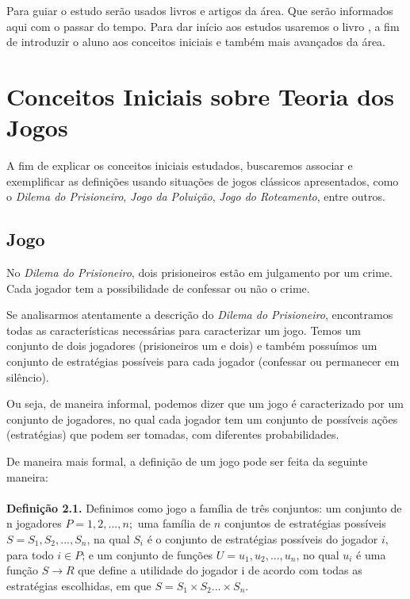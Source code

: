 \documentclass[twoside,conference,a4paper]{IEEEtran}
\begin{document}
        Para guiar o estudo serão usados livros e artigos da área. Que serão informados aqui com o passar do tempo. Para dar início aos estudos usaremos o livro \cite{algorithmic-game-theory-book}, a fim de introduzir o aluno aos conceitos iniciais e também mais avançados da área.
        
    
    \section{Conceitos Iniciais sobre Teoria dos Jogos}
        A fim de explicar os conceitos iniciais estudados, buscaremos associar e exemplificar as definições usando situações de jogos clássicos apresentados, como o \emph{Dilema do Prisioneiro}, \emph{Jogo da Poluição}, \emph{Jogo do Roteamento}, entre outros.
        
        \subsection{Jogo}
            No \emph{Dilema do Prisioneiro}, dois prisioneiros estão em julgamento por um crime. Cada jogador tem a possibilidade de confessar ou não o crime.
            
            Se analisarmos atentamente a descrição do \emph{Dilema do Prisioneiro}, encontramos todas as características necessárias para caracterizar um jogo. Temos um conjunto de dois jogadores (prisioneiros um e dois) e também possuímos um conjunto de estratégias possíveis para cada jogador (confessar ou permanecer em silêncio). 
            
            Ou seja, de maneira informal, podemos dizer que um jogo é caracterizado por um conjunto de jogadores, no qual cada jogador tem um conjunto de possíveis ações (estratégias) que podem ser tomadas, com diferentes probabilidades.
            
            De maneira mais formal, a definição de um jogo pode ser feita da seguinte maneira:\\ \\
            \textbf{Definição 2.1.} Definimos como jogo a família de três conjuntos: um conjunto de n jogadores $P = {1, 2, ..., n};$ uma família de $n$ conjuntos de estratégias possíveis $S = {S_1, S_2, ..., S_n}$, na qual $S_i$ é o conjunto de estratégias possíveis do jogador $i$, para todo $i \in P$; e um conjunto de funções $U = {u_1, u_2, ..., u_n}$, no qual $u_i$ é uma função $S \xrightarrow{} R$ que define a utilidade do jogador i de acordo com todas as estratégias escolhidas, em que $S = S_1 × S_2... × S_n$.
        
\end{document}
